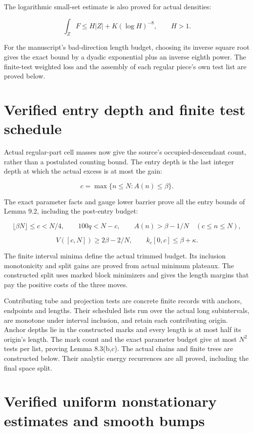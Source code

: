 \documentclass[11pt]{article}
\begin{document}
The logarithmic small-set estimate is also proved for actual densities:

\[
\int_ZF\le H|Z|+K(\log H)^{-8},\qquad H>1.
\]


For the manuscript's bad-direction length budget, choosing its inverse square
root gives the exact bound by a dyadic exponential plus an inverse eighth
power. The finite-test weighted loss and the assembly of each regular piece's
own test list are proved below.

\newpage
\section*{Verified entry depth and finite test schedule}

Actual regular-part cell masses now give the source's occupied-descendant
count, rather than a postulated counting bound. The entry depth is the last
integer depth at which the actual excess is at most the gain:

\[
c=\max\{n\le N:A(n)\le\beta\}.
\]


The exact parameter facts and gauge lower barrier prove all the entry bounds
of Lemma 9.2, including the post-entry budget:

\[
\lfloor\beta N\rfloor\le c<N/4,\qquad 100q<N-c,
\qquad A(n)>\beta-1/N\quad(c\le n\le N),
\]


\[
V([c,N])\ge2\beta-2/N,\qquad k_c[0,c]\le\beta+\kappa.
\]


The finite interval minima define the actual trimmed budget. Its inclusion
monotonicity and split gains are proved from actual minimum plateaux. The
constructed split uses marked block minimizers and gives the length margins
that pay the positive costs of the three moves.

Contributing tube and projection tests are concrete finite records with
anchors, endpoints and lengths. Their scheduled lists run over the actual
long subintervals, are monotone under interval inclusion, and retain each
contributing origin. Anchor depths lie in the constructed marks and every
length is at most half its origin's length. The mark count and the exact
parameter budget give at most $N^2$ tests per list, proving Lemma 8.3(b,c).
The actual chains and finite trees are constructed below. Their analytic
energy recurrences are all proved, including the final space split.

\newpage
\section*{Verified uniform nonstationary estimates and smooth bumps}
\end{document}
